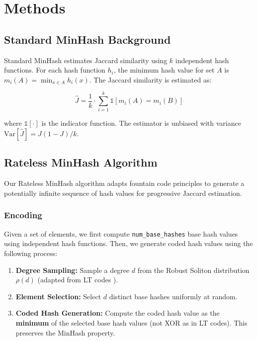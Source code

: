 \documentclass[11pt,letterpaper]{article}
\begin{document}
\section{Methods}

\subsection{Standard MinHash Background}

Standard MinHash estimates Jaccard similarity using $k$ independent hash functions. For each hash function $h_i$, the minimum hash value for set $A$ is $m_i(A) = \min_{x \in A} h_i(x)$. The Jaccard similarity is estimated as:

\begin{equation}
\hat{J} = \frac{1}{k} \cdot \sum_{i=1}^k \mathbb{1}[m_i(A) = m_i(B)]
\end{equation}

where $\mathbb{1}[\cdot]$ is the indicator function. The estimator is unbiased with variance $\text{Var}[\hat{J}] = J(1-J)/k$.

\subsection{Rateless MinHash Algorithm}

Our Rateless MinHash algorithm adapts fountain code principles to generate a potentially infinite sequence of hash values for progressive Jaccard estimation.

\subsubsection{Encoding}

Given a set of elements, we first compute \texttt{num\_base\_hashes} base hash values using independent hash functions. Then, we generate coded hash values using the following process:

\begin{enumerate}
    \item \textbf{Degree Sampling:} Sample a degree $d$ from the Robust Soliton distribution $\rho(d)$ (adapted from LT codes \cite{Luby2002}).
    \item \textbf{Element Selection:} Select $d$ distinct base hashes uniformly at random.
    \item \textbf{Coded Hash Generation:} Compute the coded hash value as the \textbf{minimum} of the selected base hash values (not XOR as in LT codes). This preserves the MinHash property.
\end{enumerate}
\end{document}
